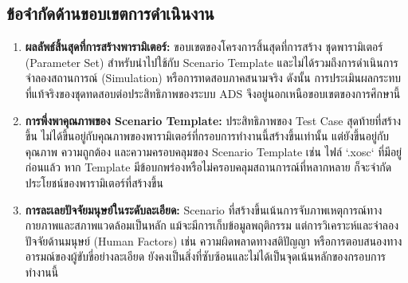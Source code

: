 \subsection{ข้อจำกัดด้านขอบเขตการดำเนินงาน}

\begin{enumerate}
    \item \textbf{ผลลัพธ์สิ้นสุดที่การสร้างพารามิเตอร์:} ขอบเขตของโครงการสิ้นสุดที่การสร้าง ชุดพารามิเตอร์ (Parameter Set) สำหรับนำไปใช้กับ Scenario Template และไม่ได้รวมถึงการดำเนินการจำลองสถานการณ์ (Simulation) หรือการทดสอบภาคสนามจริง ดังนั้น การประเมินผลกระทบที่แท้จริงของชุดทดสอบต่อประสิทธิภาพของระบบ ADS จึงอยู่นอกเหนือขอบเขตของการศึกษานี้
    \item \textbf{การพึ่งพาคุณภาพของ Scenario Template:} ประสิทธิภาพของ Test Case สุดท้ายที่สร้างขึ้น ไม่ได้ขึ้นอยู่กับคุณภาพของพารามิเตอร์ที่กรอบการทำงานนี้สร้างขึ้นเท่านั้น แต่ยังขึ้นอยู่กับคุณภาพ ความถูกต้อง และความครอบคลุมของ Scenario Template เช่น ไฟล์ `.xosc` ที่มีอยู่ก่อนแล้ว หาก Template มีข้อบกพร่องหรือไม่ครอบคลุมสถานการณ์ที่หลากหลาย ก็จะจำกัดประโยชน์ของพารามิเตอร์ที่สร้างขึ้น
    \item \textbf{การละเลยปัจจัยมนุษย์ในระดับละเอียด:} Scenario ที่สร้างขึ้นเน้นการจับภาพเหตุการณ์ทางกายภาพและสภาพแวดล้อมเป็นหลัก แม้จะมีการเก็บข้อมูลพฤติกรรม แต่การวิเคราะห์และจำลองปัจจัยด้านมนุษย์ (Human Factors) เช่น ความผิดพลาดทางสติปัญญา หรือการตอบสนองทางอารมณ์ของผู้ขับขี่อย่างละเอียด ยังคงเป็นสิ่งที่ซับซ้อนและไม่ได้เป็นจุดเน้นหลักของกรอบการทำงานนี้
\end{enumerate}